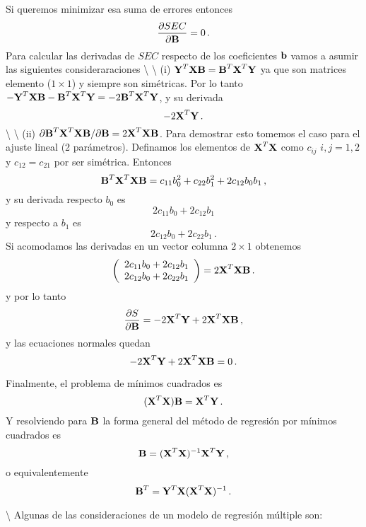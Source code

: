 \documentclass[
]{agujournal2019}
\begin{document}
\noindent Si queremos minimizar esa suma de errores entonces
\[\frac{\partial{SEC}}{\partial{\textbf B}}=0\,.\] Para calcular las
derivadas de \({SEC}\) respecto de los coeficientes \({\textbf b}\)
vamos a asumir las siguientes consideraraciones \textbackslash{}
\textbackslash{} (i)
\({\textbf Y}^T{\textbf X}{\textbf B}={\textbf B}^T{\textbf X}^T{\textbf Y}\)
ya que son matrices elemento (\(1\times1\)) y siempre son simétricas.
Por lo tanto
\(-{\textbf Y}^T{\textbf X}{\textbf B}-{\textbf B}^T{\textbf X}^T{\textbf Y}=-2{\textbf B}^T{\textbf X}^T{\textbf Y}\),
y su derivada \[-2{\textbf X}^T{\textbf Y}\,.\] \textbackslash{}
\textbackslash{} (ii)
\(\partial{{\textbf B}^T{\textbf X}^T{\textbf X}{\textbf B}}/\partial{\textbf B}=2{\textbf X}^T{\textbf X}{\textbf B}\).
Para demostrar esto tomemos el caso para el ajuste lineal (2
parámetros). Definamos los elementos de \({\textbf X}^T{\textbf X}\)
como \(c_{ij}\,\,i,j=1,2\) y \(c_{12}=c_{21}\) por ser simétrica.
Entonces
\[{\textbf B}^T{\textbf X}^T{\textbf X}{\textbf B}=c_{11}b_0^2+c_{22}b_1^2 + 2c_{12} b_0 b_1\,,\]
y su derivada respecto \(b_0\) es \[2c_{11}b_0 + 2c_{12}b_1\] y respecto
a \(b_1\) es \[2c_{12}b_0 + 2c_{22}b_1\,.\] Si acomodamos las derivadas
en un vector columna \(2\times1\) obtenemos \[\left(\begin{array}{c}
  2c_{11}b_0 + 2c_{12}b_1 \\
  2c_{12}b_0 + 2c_{22}b_1 \\
        \end{array}\right)=2{\textbf X}^T{\textbf X}{\textbf B}\,.\] y
por lo tanto
\[\frac{\partial{S}}{\partial{\textbf B}}=-2{\textbf X}^T{\textbf Y}+2{\textbf X}^T{\textbf X}{\textbf
B}\,,\] y las ecuaciones normales quedan
\[-2{\textbf X}^T{\textbf Y}+2{\textbf X}^T{\textbf X}{\textbf
B}=0\,.\]

\noindent Finalmente, el problema de mínimos cuadrados es
\[({\textbf X}^T{\textbf X}){\textbf B}={\textbf X}^T{\textbf Y}\,.\] Y
resolviendo para \({\textbf B}\) la forma general del método de
regresión por mínimos cuadrados es
\[{\textbf B}=({\textbf X}^T{\textbf X})^{-1}{\textbf X}^T{\textbf Y}\,,\]
o equivalentemente
\[{\textbf B}^T={\textbf Y}^T{\textbf X}({\textbf X}^T{\textbf X})^{-1}\,.\]

\vspace{0.5cm}

 \textbackslash{}
\noindent Algunas de las consideraciones de un modelo de regresión
múltiple son:
\end{document}
